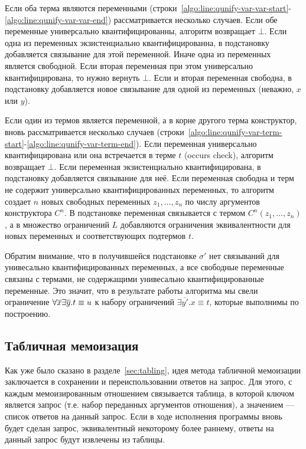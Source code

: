 Если оба терма являются переменными 
(строки~\ref{algo:line:qunify-var-var-start}-\ref{algo:line:qunify-var-var-end})
рассматривается несколько случаев.
Если обе переменные универсально квантифицированны, алгоритм возвращает $\bot$.
Если одна из переменных экзистенциально квантифицированна, 
в подстановку добавляется связывание для этой переменной.
Иначе одна из переменных является свободной.
Если вторая переменная при этом универсально квантифицирована, то нужно вернуть $\bot$.
Если и вторая переменная свободна, 
в подстановку добавляется новое связывание 
для одной из переменных (неважно, $x$ или $y$). 

Если один из термов является переменной, 
а в корне другого терма конструктор, 
вновь рассматривается несколько случаев
(строки~\ref{algo:line:qunify-var-term-start}-\ref{algo:line:qunify-var-term-end}).
Если переменная универсально квантифицирована
или она встречается в терме $t$ (occurs check),
алгоритм возвращает $\bot$.
Если переменная экзистенциально квантифицирована,
в подстановку добавляется связывание для неё.
Если переменная свободна и терм не содержит универсально квантифицированных переменных, 
то алгоритм создает $n$ новых свободных переменных $z_1, \dots, z_n$ 
по числу аргументов конструктора $C^n$.
В подстановке переменная связывается с термом $C^n(z_1, \dots, z_n)$, 
а в множество ограничений $L$ добавляются 
ограничения эквивалентности для новых переменных 
и соответствующих подтермов $t$. 

Обратим внимание, что в получившейся подстановке $\sigma'$
нет связываний для унивесально квантифицированных переменных,
а все свободные переменные связаны с термами, 
не содержащими унивесально квантифицированные переменные.
Это значит, что в результате работы алгоритма 
мы свели ограничение $\forall{\overline{x}}\exists{\overline{y}}.t \equiv u$ к набору ограничений 
$\exists{\overline{y'}.x \equiv t}$,
которые выполнимы по построению. 

\subsection{Табличная мемоизация}

\label{sec:tabling-impl}

Как уже было сказано в разделе~\ref{sec:tabling},
идея метода табличной мемоизации заключается в 
сохранении и переиспользовании ответов на запрос.
Для этого, с каждым мемоизированным отношением связывается таблица,
в которой ключом является запрос 
(т.е. набор переданных аргументов отношения),
а значением --- список ответов на данный запрос.
Если в ходе исполнения программы вновь будет сделан запрос,
эквивалентный некоторому более раннему, 
ответы на данный запрос будут извлечены из таблицы.

